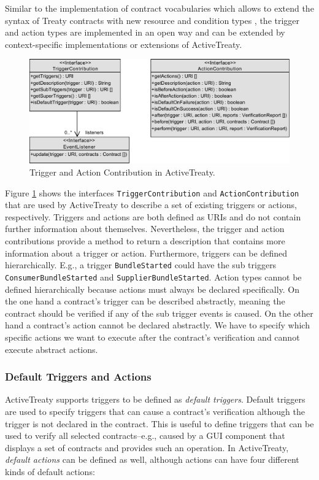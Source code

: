 \documentclass{llncs}
\begin{document}
Similar to the implementation of contract vocabularies which allows to extend the syntax of Treaty contracts with new resource and condition types \cite{Treaty.JOT2009}, the trigger and action types are implemented in an open way and can be extended by context-specific implementations or extensions of ActiveTreaty.

\begin{figure}[t]
\centering
\includegraphics[width=1.0\textwidth]{ContributorModel1.pdf}
\caption{Trigger and Action Contribution in ActiveTreaty.}
\label{fig:contribution}
\end{figure}

Figure \ref{fig:contribution} shows the interfaces \texttt{TriggerContribution} and \texttt{ActionContribution} that are used by ActiveTreaty to describe a set of existing triggers or actions, respectively. Triggers and actions are both defined as URIs and do not contain further information about themselves. Nevertheless, the trigger and action contributions provide a method to return a description that contains more information about a trigger or action. Furthermore, triggers can be defined hierarchically. E.g., a trigger \texttt{BundleStarted} could have the sub triggers \texttt{ConsumerBundleStarted} and \texttt{SupplierBundleStarted}. Action types cannot be defined hierarchically because actions must always be declared specifically. On the one hand a contract's trigger can be described abstractly, meaning the contract should be verified if any of the sub trigger events is caused. On the other hand a contract's action cannot be declared abstractly. We have to specify which specific actions we want to execute after the contract's verification and cannot execute abstract actions.


\subsubsection{Default Triggers and Actions}

ActiveTreaty supports triggers to be defined as \textit{default triggers}. Default triggers are used to specify triggers that can cause a contract's verification although the trigger is not declared in the contract. This is useful to define triggers that can be used to verify all selected contracts--e.g., caused by a GUI component that displays a set of contracts and provides such an operation. In ActiveTreaty, \textit{default actions} can be defined as well, although actions can have four different kinds of default actions:
\end{document}
